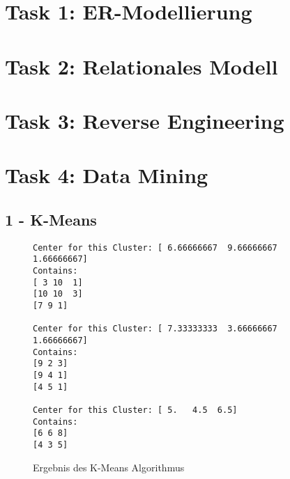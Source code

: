 
\newcommand{\dozent}{Prof. Dr. Agnès Voisard \\ Nicolas Lehmann}					%
\newcommand{\tutor}{Toni Draßdo}						%
\newcommand{\tutoriumNo}{014}				%
\newcommand{\ubungNo}{04}									%
\newcommand{\veranstaltung}{Datenbanksysteme}	%
\newcommand{\semester}{SoSe 18}						%
\newcommand{\studenten}{Eduard Beiline, Mark Niehues, Antoen Oehler}			%

\usepackage[normalem]{ulem}





\section*{Task 1: ER-Modellierung}


\section*{Task 2: Relationales Modell}


\section*{Task 3: Reverse Engineering}

\section*{Task 4: Data Mining}
\subsection*{1 - K-Means}
\begin{figure}[h!]
\begin{verbatim}
Center for this Cluster: [ 6.66666667  9.66666667  1.66666667]
Contains:
[ 3 10  1]
[10 10  3]
[7 9 1]

Center for this Cluster: [ 7.33333333  3.66666667  1.66666667]
Contains:
[9 2 3]
[9 4 1]
[4 5 1]

Center for this Cluster: [ 5.   4.5  6.5]
Contains:
[6 6 8]
[4 3 5]
\end{verbatim}
\caption{Ergebnis des K-Means Algorithmus}
\end{figure}

